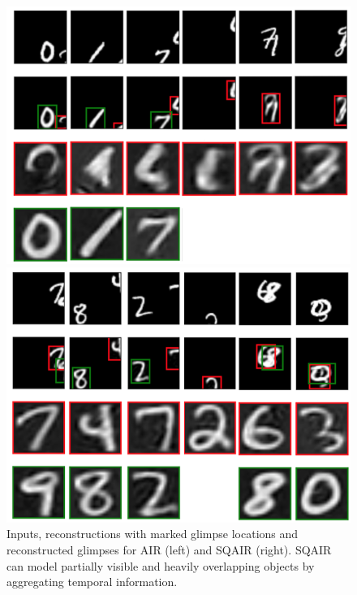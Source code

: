 \begin{figure}
    \centering
    \begin{minipage}[c]{0.3\linewidth}
        \centering
        \includegraphics[width=\linewidth]{figures/SQAIR/air_partial_glimpse}
    \end{minipage}
    \hfill
    \begin{minipage}[c]{0.3\linewidth}
        \centering
        \includegraphics[width=\linewidth]{figures/SQAIR/sqair_partial_glimpse}
    \end{minipage}
       \hfill
    \begin{minipage}[c]{0.35\linewidth}
        \centering
        \caption{Inputs, reconstructions with marked glimpse locations and reconstructed glimpses for \gls{AIR} (left) and \gls{SQAIR} (right). \Gls{SQAIR} can model partially visible and heavily overlapping objects by aggregating temporal information.}
        \label{fig:partial_glimpse}
    \end{minipage}
\end{figure}


